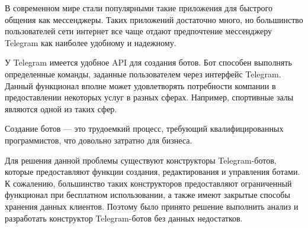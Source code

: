 
В современном мире стали популярными такие приложения для
быстрого общения как мессенджеры. Таких приложений достаточно много, но
большинство пользователей сети интернет все чаще отдают предпочтение
мессенджеру Telegram как наиболее удобному и надежному.

У Telegram имеется удобное API для создания ботов. Бот способен
выполнять определенные команды, заданные пользователем через интерфейс
Telegram. Данный функционал вполне может удовлетворять потребности
компании в предоставлении некоторых услуг в разных сферах. Например,
спортивные залы являются одной из таких сфер.

Создание ботов — это трудоемкий процесс, требующий
квалифицированных программистов, что довольно затратно для бизнеса.

Для решения данной проблемы существуют конструкторы Telegram-ботов, которые
предоставляют функции создания, редактирования и управления ботами.
К сожалению, большинство таких конструкторов предоставляют ограниченный функционал
при бесплатном использовании, а также имеют закрытые
способы хранения данных клиентов. Поэтому было принято решение выполнить анализ и
разработать конструктор Telegram-ботов без данных недостатков.


\pagebreak


